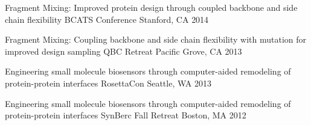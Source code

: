 

\begin{cventries}

  \cventry
  {Fragment Mixing: Improved protein design through coupled backbone and side chain flexibility} %
  {BCATS Conference} %
  {Stanford, CA} %
  {2014} %
  {}

  \cventry
  {Fragment Mixing: Coupling backbone and side chain flexibility with mutation for improved design sampling} %
  {QBC Retreat} %
  {Pacific Grove, CA} %
  {2013} %
  {}

  \cventry
  {Engineering small molecule biosensors through computer-aided remodeling of protein-protein interfaces} %
  {RosettaCon} %
  {Seattle, WA} %
  {2013} %
  {}

  \cventry
  {Engineering small molecule biosensors through computer-aided remodeling of protein-protein interfaces} %
  {SynBerc Fall Retreat} %
  {Boston, MA} %
  {2012} %
  {}

\end{cventries}
